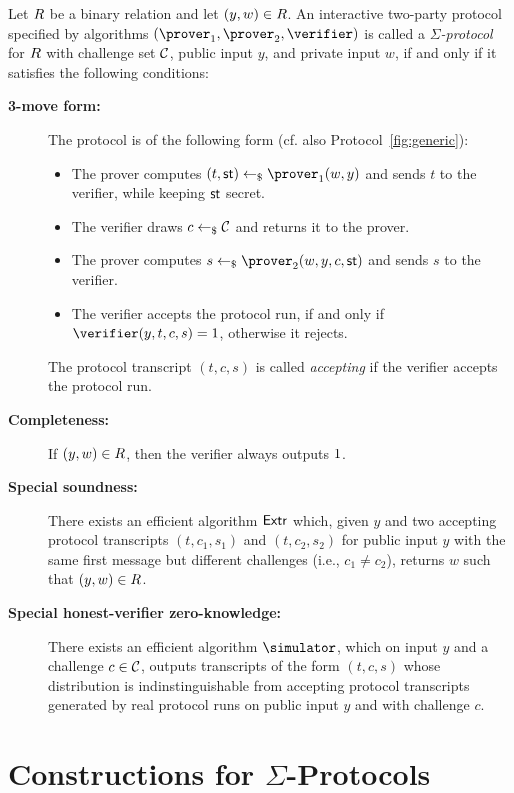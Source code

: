 \documentclass[runningheads]{llncs}
\begin{document}
\begin{definition}
  Let $R$ be a binary relation and let $(y,w)\in R$.
  An interactive two-party protocol specified by algorithms $(\prover_1,\prover_2,\verifier)$ is called a \emph{$\Sigma$-protocol} for $R$ with challenge set $\mathcal{C}$, public input $y$, and private input $w$, if and only if it satisfies the following conditions:
  \begin{description}
    \item[\bf 3-move form:] 
      The protocol is of the following form (cf. also Protocol~\ref{fig:generic}):
      \begin{itemize}
        \item
          The prover computes $(t,\st) \getsr \prover_1(w,y)$ and sends $t$ to the verifier, while keeping $\mathsf{st}$ secret.
        \item
          The verifier draws $c\gets_{\$}\mathcal{C}$ and returns it to the prover.
        \item
          The prover computes $s\getsr\prover_2(w,y,c,\st)$ and sends $s$ to the verifier.
        \item
          The verifier accepts the protocol run, if and only if $\verifier(y,t,c,s)=\accept$, otherwise it rejects.
      \end{itemize}
      The protocol transcript $(t,c,s)$ is called \emph{accepting} if the verifier accepts the protocol run.
    \item[\bf Completeness:]
      If $(y,w)\in R$, then the verifier always outputs $1$.
    \item[\bf Special soundness:]
      There exists an efficient algorithm $\mathsf{Extr}$ which, given $y$ and two accepting protocol transcripts $(t,c_1,s_1)$ and $(t,c_2,s_2)$ for public input $y$ with the same first message but different challenges (i.e., $c_1\ne c_2$), returns $w$ such that $(y,w)\in R$.
    \item[\bf Special honest-verifier zero-knowledge:]
      There exists an efficient algorithm $\simulator$, which on input $y$ and a challenge $c\in\mathcal{C}$, outputs transcripts of the form $(t,c,s)$ whose distribution is indinstinguishable from accepting protocol transcripts generated by real protocol runs on public input $y$ and with challenge $c$.
  \end{description}
\end{definition}

\section{Constructions for $\Sigma$-Protocols}
\end{document}
